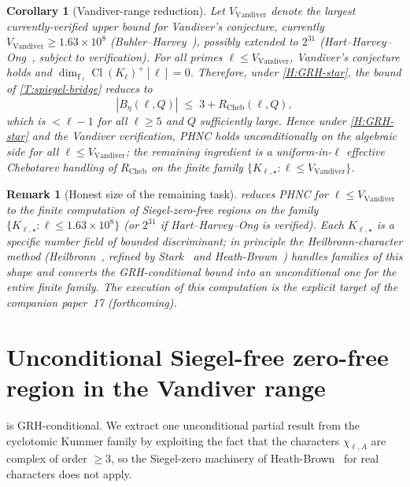 \documentclass[11pt]{article}
\newtheorem{corollary}{Corollary}
\newtheorem{remark}{Remark}
\newcommand{\F}{\mathbb F}
\newcommand{\Cl}{\operatorname{Cl}}
\begin{document}
\begin{corollary}[Vandiver-range reduction]\label{C:vandiver-reduction}
Let \(V_{\mathrm{Vandiver}}\) denote the largest currently-verified upper bound for Vandiver's conjecture, currently \(V_{\mathrm{Vandiver}}\ge 1.63\times 10^8\) (Buhler--Harvey~\cite{BuhlerHarvey}), possibly extended to \(2^{31}\) (Hart--Harvey--Ong~\cite{HartHarveyOng}, subject to verification).  For all primes \(\ell\le V_{\mathrm{Vandiver}}\), Vandiver's conjecture holds and \(\dim_{\F_\ell}\Cl(K_\ell)^+[\ell]=0\).  Therefore, under \cref{H:GRH-star}, the bound of \cref{T:spiegel-bridge} reduces to
\[
|B_\eta(\ell,Q)|\;\le\;3+R_{\mathrm{Cheb}}(\ell,Q),
\]
which is \(<\ell-1\) for all \(\ell\ge 5\) and \(Q\) sufficiently large.  Hence under \cref{H:GRH-star} and the Vandiver verification, PHNC holds unconditionally on the algebraic side for all \(\ell\le V_{\mathrm{Vandiver}}\); the remaining ingredient is a uniform-in-\(\ell\) effective Chebotarev handling of \(R_{\mathrm{Cheb}}\) on the finite family \(\{K_{\ell,\star}\colon\ell\le V_{\mathrm{Vandiver}}\}\).
\end{corollary}

\begin{remark}[Honest size of the remaining task]
 reduces PHNC for \(\ell\le V_{\mathrm{Vandiver}}\) to the finite computation of Siegel-zero-free regions on the family \(\{K_{\ell,\star}\colon\ell\le 1.63\times 10^8\}\) (or \(2^{31}\) if Hart--Harvey--Ong is verified).  Each \(K_{\ell,\star}\) is a specific number field of bounded discriminant; in principle the Heilbronn-character method (Heilbronn~\cite{Heilbronn1934}, refined by Stark~\cite{Stark1974} and Heath-Brown~\cite{HeathBrown1992}) handles families of this shape and converts the GRH-conditional bound into an unconditional one for the entire finite family.  The execution of this computation is the explicit target of the companion paper~17 (forthcoming).
\end{remark}

\section{Unconditional Siegel-free zero-free region in the Vandiver range}\label{S:siegel-free}

 is GRH-conditional.  We extract one unconditional partial result from the cyclotomic Kummer family by exploiting the fact that the characters \(\chi_{\ell,A}\) are complex of order \(\ge 3\), so the Siegel-zero machinery of Heath-Brown~\cite{HeathBrown1992} for real characters does not apply.
\end{document}
